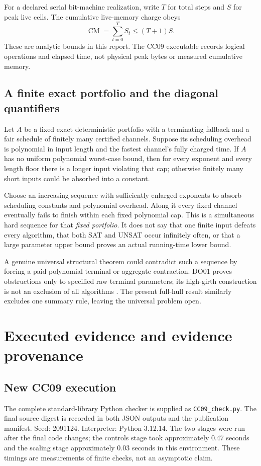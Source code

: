 \documentclass[11pt,letterpaper]{article}
\theoremstyle{definition}
\newcommand{\CM}{\operatorname{CM}}
\begin{document}
For a declared serial bit-machine realization, write $T$ for total steps and $S$ for peak live cells. The cumulative live-memory charge obeys
\[
\CM=\sum_{t=0}^{T}S_t\le(T+1)S.
\]
These are analytic bounds in this report. The CC09 executable records logical operations and elapsed time, not physical peak bytes or measured cumulative memory.

\subsection{A finite exact portfolio and the diagonal quantifiers}

Let $A$ be a fixed exact deterministic portfolio with a terminating fallback and a fair schedule of finitely many certified channels. Suppose its scheduling overhead is polynomial in input length and the fastest channel's fully charged time. If $A$ has no uniform polynomial worst-case bound, then for every exponent and every length floor there is a longer input violating that cap; otherwise finitely many short inputs could be absorbed into a constant.

Choose an increasing sequence with sufficiently enlarged exponents to absorb scheduling constants and polynomial overhead. Along it every fixed channel eventually fails to finish within each fixed polynomial cap. This is a simultaneous hard sequence for that \emph{fixed portfolio}. It does not say that one finite input defeats every algorithm, that both SAT and UNSAT occur infinitely often, or that a large parameter upper bound proves an actual running-time lower bound.

A genuine universal structural theorem could contradict such a sequence by forcing a paid polynomial terminal or aggregate contraction. DO01 proves obstructions only to specified raw terminal parameters; its high-girth construction is not an exclusion of all algorithms \cite{do01}. The present full-hull result similarly excludes one summary rule, leaving the universal problem open.

\section{Executed evidence and evidence provenance}

\subsection{New CC09 execution}

The complete standard-library Python checker is supplied as \texttt{CC09\_check.py}. The final source digest is recorded in both JSON outputs and the publication manifest. Seed: 2091124. Interpreter: Python 3.12.14. The two stages were run after the final code changes; the controls stage took approximately 0.47 seconds and the scaling stage approximately 0.03 seconds in this environment. These timings are measurements of finite checks, not an asymptotic claim.
\end{document}
